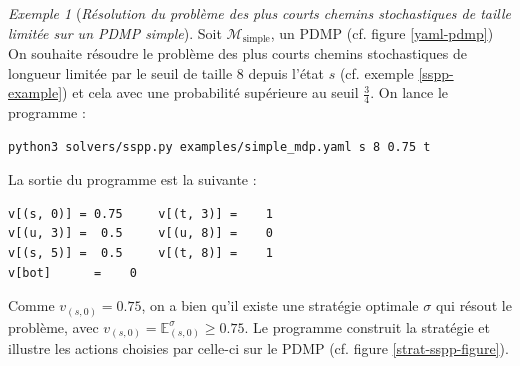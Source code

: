 \documentclass[12pt,a4paper]{report}
\theoremstyle{definition}%
\theoremstyle{remark}
\newtheorem{example}{Exemple}[chapter]
\begin{document}
\begin{example}[\textit{Résolution du problème des plus courts chemins stochastiques de taille limitée sur un PDMP simple}]
Soit $\mathcal{M}_\text{simple}$, un PDMP (cf. figure \ref{yaml-pdmp})
On souhaite résoudre le problème des plus courts chemins stochastiques de
longueur limitée par le seuil de taille 8 depuis l'état $s$ (cf. exemple
\ref{sspp-example}) et cela avec une probabilité supérieure au seuil $\frac{3}{4}$. On lance le programme :

\scriptsize
\begin{verbatim}
python3 solvers/sspp.py examples/simple_mdp.yaml s 8 0.75 t
\end{verbatim}
\normalsize

La sortie du programme est la suivante :
\scriptsize
\begin{verbatim}
v[(s, 0)] = 0.75 	 v[(t, 3)] =    1
v[(u, 3)] =  0.5 	 v[(u, 8)] =    0
v[(s, 5)] =  0.5 	 v[(t, 8)] =    1
v[bot]      =    0
\end{verbatim}
\normalsize
Comme $v_{(s, 0)} = 0.75$, on a bien qu'il existe une stratégie optimale
$\sigma$ qui résout le problème, avec $v_{(s, 0)} = \mathbb{E}_{(s, 0)}^\sigma \geq 0.75$. Le programme construit la stratégie et illustre les actions choisies par celle-ci sur le PDMP (cf. figure \ref{strat-sspp-figure}).
\end{example}
\end{document}
